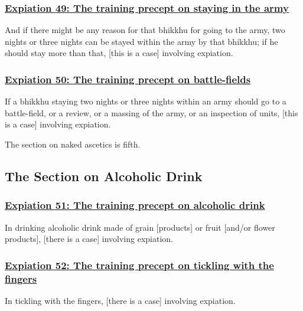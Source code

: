 \subsubsection*{\hyperref[pac49]{Expiation 49: The training precept on staying in the army}}
\label{exp49}
And if there might be any reason for that bhikkhu for going to the army, two nights or three nights can be stayed within the army by that bhikkhu; if he should stay more than that, [this is a case] involving expiation.



\subsubsection*{\hyperref[pac50]{Expiation 50: The training precept on battle-fields}}
\label{exp50}
If a bhikkhu staying two nights or three nights within an army should go to a battle-field, or a review, or a massing of the army, or an inspection of units, [this is a case] involving expiation.

\begin{center}
The section on naked ascetics is fifth.
\end{center}



\setsubsecheadstyle{\subsectionFmt}
\subsection{The Section on Alcoholic Drink}

\subsubsection*{\hyperref[pac51]{Expiation 51: The training precept on alcoholic drink}}
\label{exp51}
In drinking alcoholic drink made of grain [products] or fruit [and/or flower products], [there is a case] involving expiation.



\subsubsection*{\hyperref[pac52]{Expiation 52: The training precept on tickling with the fingers}}
\label{exp52}
In tickling with the fingers, [there is a case] involving expiation.



